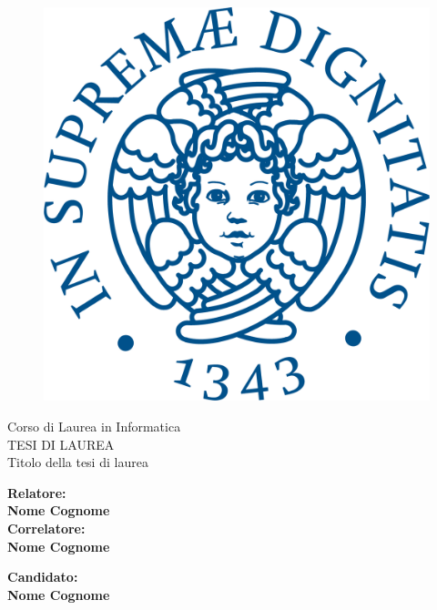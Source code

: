 \begin{titlepage}
  \begin{figure}
      \centering\includegraphics[scale=0.5]{assets/images/cherubino_pant541.png}
  \end{figure}

  \begin{center}
      {\LARGE{ Corso di Laurea in Informatica \\}}
      \vspace{2cm}
      {\Large { TESI DI LAUREA }}\\
      \vspace{2cm}
      {\Large { Titolo della tesi di laurea }}
  \end{center}

  \vspace{2cm}

  \begin{minipage}[t]{0.47\textwidth}
    {\large{\bf Relatore:\\ Nome Cognome}}
    \vspace{0.5cm}
    {\large{\bf \\Correlatore:\\ Nome Cognome}}
  \end{minipage}
  \hfill
  \begin{minipage}[t]{0.47\textwidth}\raggedleft
    {\large{\bf Candidato: \\ Nome Cognome\\ }}
  \end{minipage}

  \vspace{25mm}

\end{titlepage}
